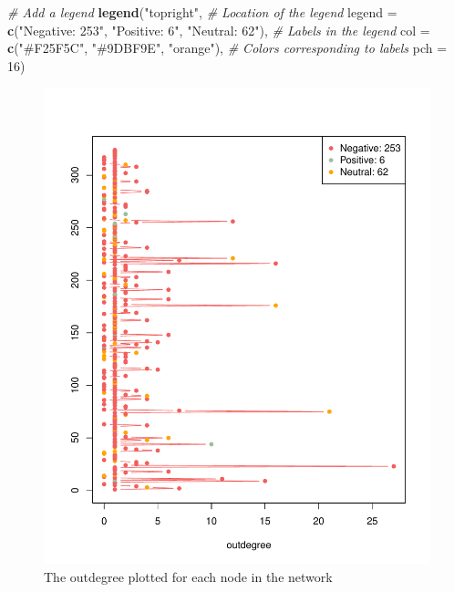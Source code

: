 \documentclass[
  man,floatsintext]{apa6}
\newenvironment{Shaded}{\begin{snugshade}}{\end{snugshade}}
\newcommand{\AttributeTok}[1]{\textcolor[rgb]{0.13,0.29,0.53}{#1}}
\newcommand{\CommentTok}[1]{\textcolor[rgb]{0.56,0.35,0.01}{\textit{#1}}}
\newcommand{\DecValTok}[1]{\textcolor[rgb]{0.00,0.00,0.81}{#1}}
\newcommand{\FunctionTok}[1]{\textcolor[rgb]{0.13,0.29,0.53}{\textbf{#1}}}
\newcommand{\NormalTok}[1]{#1}
\newcommand{\StringTok}[1]{\textcolor[rgb]{0.31,0.60,0.02}{#1}}
\begin{document}
\begin{Shaded}
\begin{Highlighting}[]
\CommentTok{\# Add a legend}
\FunctionTok{legend}\NormalTok{(}\StringTok{"topright"}\NormalTok{, }\CommentTok{\# Location of the legend}
       \AttributeTok{legend =} \FunctionTok{c}\NormalTok{(}\StringTok{"Negative: 253"}\NormalTok{, }
                  \StringTok{"Positive: 6"}\NormalTok{, }
                  \StringTok{"Neutral: 62"}\NormalTok{), }\CommentTok{\# Labels in the legend}
       \AttributeTok{col =} \FunctionTok{c}\NormalTok{(}\StringTok{"\#F25F5C"}\NormalTok{, }
               \StringTok{"\#9DBF9E"}\NormalTok{, }
               \StringTok{"orange"}\NormalTok{), }\CommentTok{\# Colors corresponding to labels}
       \AttributeTok{pch =} \DecValTok{16}\NormalTok{)}
\end{Highlighting}
\end{Shaded}

\begin{figure}[H]
\includegraphics{SNA4DS_Report_files/figure-latex/outdegree-plot-1} \caption{The outdegree plotted for each node in the network}\label{fig:outdegree-plot}
\end{figure}
\end{document}
